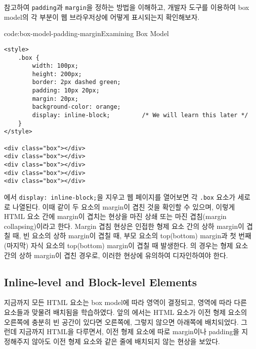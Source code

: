 \을 참고하여 \texttt{padding}과 \texttt{margin}을 정하는 방법을 이해하고, 개발자 도구를 이용하여 box model의 각 부분이 웹 브라우저상에 어떻게 표시되는지 확인해보자. 

\begin{codeenv}{code:box-model-padding-margin}{Examining Box Model}\begin{verbatim}
<style>
    .box {
        width: 100px;
        height: 200px;
        border: 2px dashed green;
        padding: 10px 20px;
        margin: 20px;
        background-color: orange;
        display: inline-block;         /* We will learn this later */
    }
</style>

<div class="box"></div>
<div class="box"></div>
<div class="box"></div>
<div class="box"></div>
<div class="box"></div>
\end{verbatim}
\end{codeenv}

에서 \texttt{display: inline-block;}을 지우고 웹 페이지를 열어보면 각 \texttt{.box} 요소가 세로로 나열된다. 이때 \과 같이 두 요소의 margin이 겹친 것을 확인할 수 있으며, 이렇게 HTML 요소 간에 margin이 겹치는 현상을 마진 상쇄 또는 마진 겹침(margin collapsing)이라고 한다. Margin 겹침 현상은 인접한 형제 요소 간의 상하 margin이 겹칠 때, 빈 요소의 상하 margin이 겹칠 때, 부모 요소의 top(bottom) margin과 첫 번째(마지막) 자식 요소의 top(bottom) margin이 겹칠 때 발생한다. 의 경우는 형제 요소 간의 상하 margin이 겹친 경우로, 이러한 현상에 유의하여 디자인하여야 한다.


\subsection*{Inline-level and Block-level Elements}

지금까지 모든 HTML 요소는 box model에 따라 영역이 결정되고, 영역에 따라 다른 요소들과 맞물려 배치됨을 학습하였다. 앞의 에서는 HTML 요소가 이전 형제 요소의 오른쪽에 충분히 빈 공간이 있다면 오른쪽에, 그렇지 않으면 아래쪽에 배치되었다. 그런데 지금까지 HTML을 다루면서, 이전 형제 요소에 따로 margin이나 padding을 지정해주지 않아도 이전 형제 요소와 같은 줄에 배치되지 않는 현상을 보았다.


